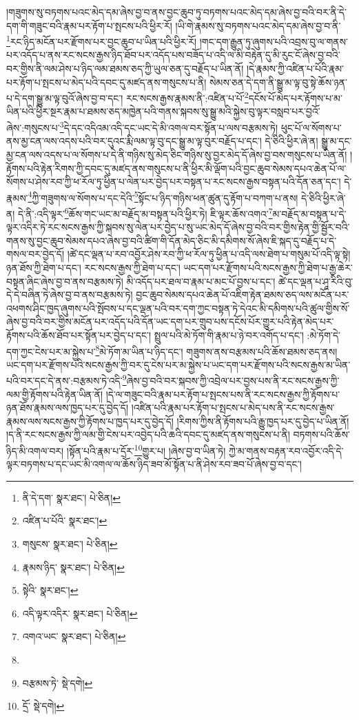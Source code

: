 །གཟུགས་སུ་བཏགས་པའང་མེད་དམ་ཞེས་བྱ་བ་ནས་བྱང་ཆུབ་ཏུ་བཏགས་པའང་མེད་དམ་ཞེས་བྱ་བའི་བར་ནི་དེ་དག་གི་གཟུང་བའི་རྣམ་པར་རྟོག་པ་སྤངས་པའི་ཕྱིར་རོ། །ཡི་གེ་རྣམས་སུ་བཏགས་པའང་མེད་དམ་ཞེས་བྱ་བ་ནི་\footnote{ནི་དེ་དག་  སྣར་ཐང་།  པེ་ཅིན། }རང་ཉིད་མངོན་པར་རྫོགས་པར་བྱང་ཆུབ་པ་ཡིན་པའི་ཕྱིར་རོ། །གང་དག་རྒྱུན་ཏུ་ཞུགས་པའི་འབྲས་བུ་ལ་གནས་པར་འདོད་པ་ནས་རང་སངས་རྒྱས་ཉིད་ཐོབ་པར་འདོད་པས་བཟོད་པ་འདི་ལ་མི་བརྟེན་དུ་མི་རུང་ངོ་ཞེས་བྱ་བའི་བར་གྱིས་ནི་ལམ་ཤེས་པ་ཉིད་ལམ་ཐམས་ཅད་ཀྱི་ཡུལ་ཅན་དུ་བརྗོད་པ་ཡིན་ནོ། །དེ་རྣམས་ཀྱི་འཛིན་པ་པོའི་རྣམ་པར་རྟོག་པ་སྤངས་པ་མེད་པའི་དབང་དུ་མཛད་ནས་གསུངས་པ་ནི། སེམས་ཅན་དེ་དག་ནི་སྒྱུ་མ་ལྟ་བུ་སྟེ་ཆོས་ཉན་པ་དེ་དག་སྒྱུ་མ་ལྟ་བུའོ་ཞེས་བྱ་བ་དང་། རང་སངས་རྒྱས་རྣམས་ནི་:འཛིན་པ་པོ་\footnote{འཛིན་པ་པོའི་  སྣར་ཐང་། }དངོས་པོ་མེད་པར་རྟོགས་པ་མ་ཡིན་པའི་ཕྱིར་སྔར་རྣམ་པ་ཐམས་ཅད་མཁྱེན་པའི་གནས་སྐབས་སུ་སྒྱུ་མའི་སྐྱེས་བུ་ལྟར་བསླབ་པར་བྱའོ་ཞེས་:གསུངས་པ་\footnote{གསུངས་  སྣར་ཐང་།  པེ་ཅིན། }དེ་དང་འདིའམ་འདི་དང་ཡང་དེ་མི་འགལ་བར་སྟོན་པ་ལས་བརྩམས་ཏེ། ཕུང་པོ་ལ་སོགས་པ་ནས་མྱ་ངན་ལས་འདས་པའི་བར་དུའང་རྨི་ལམ་ལྟ་བུ་དང་སྒྱུ་མ་ལྟ་བུར་བརྗོད་པ་དང་། དེ་ཅིའི་ཕྱིར་ཞེ་ན། སྒྱུ་མ་དང་མྱ་ངན་ལས་འདས་པ་ལ་སོགས་པ་དེ་ནི་གཉིས་སུ་མེད་ཅིང་གཉིས་སུ་བྱར་མེད་དོ་ཞེས་བྱ་བས་གསུངས་པ་ཡིན་ནོ། །རྟོགས་པའི་རྟེན་རིགས་ཀྱི་དབང་དུ་མཛད་ནས་གསུངས་པ་ནི་ཕྱིར་མི་ལྡོག་པའི་བྱང་ཆུབ་སེམས་དཔའ་ཆེན་པོ་ལ་སོགས་པ་ཤེས་རབ་ཀྱི་ཕ་རོལ་ཏུ་ཕྱིན་པ་ལེན་པར་བྱེད་པར་བསྟན་པ་རང་སངས་རྒྱས་བསྟན་པའི་དོན་ཅན་དང་། དེ་རྣམས་\footnote{རྣམས་ཉིད་  སྣར་ཐང་།  པེ་ཅིན། }ཀྱི་གཟུགས་ལ་སོགས་པ་དང་དེའི་\footnote{སྟེའི་  སྣར་ཐང་། }སྟོང་པ་ཉིད་གཉིས་ཕན་ཚུན་དུ་རྟོག་པ་བཀག་པ་ནས། དེ་ཅིའི་ཕྱིར་ཞེ་ན། དེ་ནི་:འདི་ལྟར་\footnote{འདི་ལྟར་འདིར་  སྣར་ཐང་།  པེ་ཅིན། }ཆོས་གང་ཡང་མ་བརྗོད་མ་བསྟན་པའི་ཕྱིར་ཏེ། ཇི་ལྟར་ཆོས་འགའ་\footnote{འགའ་ཡང་  སྣར་ཐང་།  པེ་ཅིན། }མ་བརྗོད་མ་བསྟན་པ་དེ་ལྟར་འདིར་ཏེ་རང་སངས་རྒྱས་ཀྱི་སྐབས་སུ་ལེན་པར་བྱེད་པ་སུ་ཡང་མེད་དོ་ཞེས་བྱ་བའི་བར་གྱིས་རྟེན་གྱི་སྦྱོར་བའི་གནས་སུ་བྱང་ཆུབ་སེམས་དཔའ་ཞེས་བྱ་བའི་ཚིག་གི་དོན་མེད་ཅིང་མི་དམིགས་སོ་ཞེས་ཇི་སྐད་དུ་བརྗོད་པ་དེ་གསལ་བར་བྱེད་དོ། །ཚེ་དང་ལྡན་པ་རབ་འབྱོར་ཤེས་རབ་ཀྱི་ཕ་རོལ་ཏུ་ཕྱིན་པ་འདི་ལས་ཐེག་པ་གསུམ་པོ་འདི་ལྟ་སྟེ། ཉན་ཐོས་ཀྱི་ཐེག་པ་དང་། རང་སངས་རྒྱས་ཀྱི་ཐེག་པ་དང་། ཡང་དག་པར་རྫོགས་པའི་སངས་རྒྱས་ཀྱི་ཐེག་པ་རྒྱ་ཆེར་བསྟན་ཞིང་ཞེས་བྱ་བ་ནས་བརྩམས་ཏེ། མི་འདོད་པར་ཐལ་བ་རྣམ་པ་མང་པོ་བྱས་པ་དང་། ཚེ་དང་ལྡན་པ་ཤཱ་རིའི་བུ་དེ་དེ་བཞིན་ཏེ་ཞེས་བྱ་བ་ནས་བརྩམས་ཏེ། བྱང་ཆུབ་སེམས་དཔའ་ཆེན་པོ་འཇིག་རྟེན་ཐམས་ཅད་ལས་མངོན་པར་འཕགས་ཤིང་ཁྱད་ཞུགས་པའི་སྤོབས་པ་དང་ལྡན་པའི་བར་དག་ཀྱང་བསྟན་ཏེ་དེའང་མི་དམིགས་པའི་ཚུལ་གྱིས་སོ་ཞེས་བྱ་བའི་བར་གྱིས་མངོན་པར་འདོད་པའི་དོན་ཡང་དག་པར་གྲུབ་པས་དངོས་པོར་གྱུར་པའི་རྟེན་མེད་པར་རྟོགས་པའི་ཆོས་ཐོབ་པར་སྟོན་པར་བྱེད་པ་དང་། སྤྲུལ་པའི་མེ་ཏོག་གི་རྣམ་པ་ཉེ་བར་འགོད་པ་དང་། :མེ་ཏོག་དེ་དག་ཀྱང་ངེས་པར་མ་སྐྱེས་པ་\footnote{}མེ་ཏོག་མ་ཡིན་པ་ཉིད་དང་། གཟུགས་ནས་བརྩམས་པའི་ཆོས་ཐམས་ཅད་ནས། ཡང་དག་པར་རྫོགས་པའི་སངས་རྒྱས་ཀྱི་བར་དུ་ངེས་པར་མ་སྐྱེས་པ་ཡང་དག་པར་རྫོགས་པའི་སངས་རྒྱས་མ་ཡིན་པའི་བར་དང་དེ་ནས་:བརྩམས་ཏེ་འདི་\footnote{བརྩམས་ཏེ་  སྡེ་དགེ། }ཞེས་བྱ་བའི་བར་སྐབས་ཀྱི་འབྲེལ་པར་བྱས་པས་ནི་རང་སངས་རྒྱས་ཀྱི་ལམ་གྱི་རྟོགས་པའི་རྟེན་ཡིན་ནོ། །དེ་ལ་གཟུང་བའི་རྣམ་པར་རྟོག་པ་སྤངས་པས་ནི་རང་སངས་རྒྱས་ཀྱི་རྟོགས་པ་ཉན་ཐོས་རྣམས་ལས་ཁྱད་པར་དུ་བྱེད་དོ། །འཛིན་པའི་རྣམ་པར་རྟོག་པ་སྤངས་པ་མེད་པས་ནི་རང་སངས་རྒྱས་རྣམས་ལས་སངས་རྒྱས་ཀྱི་རྟོགས་པ་ཁྱད་པར་དུ་བྱེད་དོ། །རིགས་ཀྱིས་ནི་རྟོགས་པའི་རྒྱུ་ཁྱད་པར་དུ་བྱེད་པ་ཡིན་ནོ། །ད་ནི་རང་སངས་རྒྱས་ཀྱི་ལམ་གྱི་ངེས་པར་འབྱེད་པའི་ཆའི་དབང་དུ་མཛད་ནས་གསུངས་པ་ནི། བཏགས་པའི་ཆོས་ཉིད་མི་འགལ་བར། །སྟོན་པའི་རྣམ་པ་དྲོར་\footnote{དྲོ་  སྡེ་དགེ། }གྱུར་པ། །ཞེས་བྱ་བ་ཡིན་ཏེ། ཀྱེ་མ་གནས་བརྟན་རབ་འབྱོར་འདི་དེ་ལྟར་བཏགས་པ་དང་ཡང་མི་འགལ་ལ་ཆོས་ཉིད་ཟབ་མོ་སྟོན་པ་ནི་ཤེས་རབ་ཟབ་པོ་ཞེས་བྱ་བ་དང་། 